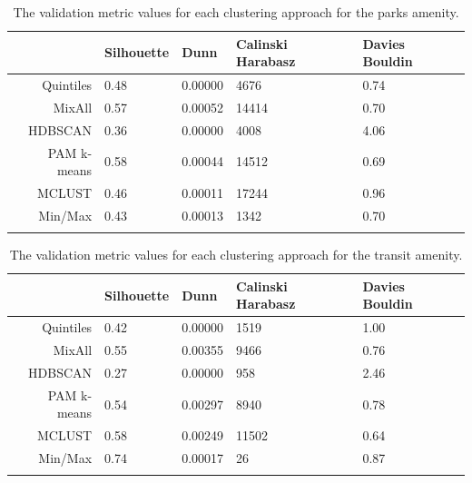 \documentclass[11pt, a4paper]{article}
\begin{document}
\centering
\begin{longtable}[H]{|r|llll|}
  \hline
 & Silhouette & Dunn & Calinski Harabasz & Davies Bouldin \\ 
  \hline
Quintiles & 0.48 & 0.00000 &  4676 & 0.74 \\ 
   \hline
MixAll & 0.57 & 0.00052 & 14414 & 0.70 \\ 
   \hline
HDBSCAN & 0.36 & 0.00000 &  4008 & 4.06 \\ 
   \hline
PAM k-means & 0.58 & 0.00044 & 14512 & 0.69 \\ 
   \hline
MCLUST & 0.46 & 0.00011 & 17244 & 0.96 \\ 
   \hline
Min/Max & 0.43 & 0.00013 &  1342 & 0.70 \\ 
   \hline
\caption[Parks validation metrics]{The validation metric values for each clustering approach for the parks amenity.}\label{parksvalid}
\end{longtable}









\centering
\begin{longtable}[H]{|r|llll|}
  \hline
 & Silhouette & Dunn & Calinski Harabasz & Davies Bouldin \\ 
  \hline
Quintiles & 0.42 & 0.00000 &  1519 & 1.00 \\ 
   \hline
MixAll & 0.55 & 0.00355 &  9466 & 0.76 \\ 
   \hline
HDBSCAN & 0.27 & 0.00000 &   958 & 2.46 \\ 
   \hline
PAM k-means & 0.54 & 0.00297 &  8940 & 0.78 \\ 
   \hline
MCLUST & 0.58 & 0.00249 & 11502 & 0.64 \\ 
   \hline
Min/Max & 0.74 & 0.00017 &    26 & 0.87 \\ 
   \hline
\caption[Transit validation metrics]{The validation metric values for each clustering approach for the transit amenity.}\label{transitvalid}
\end{longtable}
\end{document}
